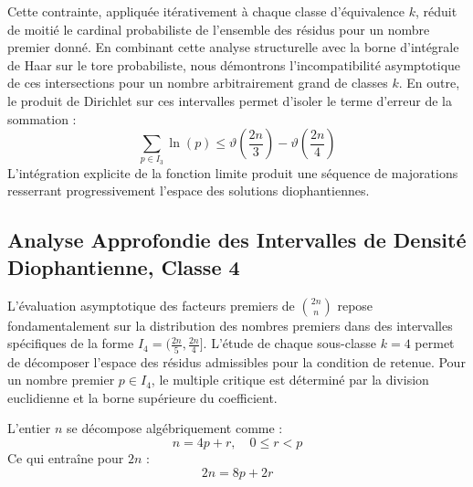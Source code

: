\documentclass[12pt,a4paper]{article}
\begin{document}
    Cette contrainte, appliquée itérativement à chaque classe d'équivalence $k$, réduit de moitié le cardinal probabiliste de l'ensemble des résidus pour un nombre premier donné.
    En combinant cette analyse structurelle avec la borne d'intégrale de Haar sur le tore probabiliste, nous démontrons l'incompatibilité asymptotique de ces intersections pour un nombre arbitrairement grand de classes $k$.
    En outre, le produit de Dirichlet sur ces intervalles permet d'isoler le terme d'erreur de la sommation :
    \begin{equation}
    \sum_{p \in I_3} \ln(p) \le \vartheta\left(\frac{2n}{3}\right) - \vartheta\left(\frac{2n}{4}\right)
    \end{equation}
    L'intégration explicite de la fonction limite produit une séquence de majorations resserrant progressivement l'espace des solutions diophantiennes.
    
    \newpage
    \subsection{Analyse Approfondie des Intervalles de Densité Diophantienne, Classe 4}
    L'évaluation asymptotique des facteurs premiers de $\binom{2n}{n}$ repose fondamentalement sur la distribution des nombres premiers dans des intervalles spécifiques de la forme $I_4 = (\frac{2n}{5}, \frac{2n}{4}]$.
    L'étude de chaque sous-classe $k = 4$ permet de décomposer l'espace des résidus admissibles pour la condition de retenue.
    Pour un nombre premier $p \in I_4$, le multiple critique est déterminé par la division euclidienne et la borne supérieure du coefficient.

    L'entier $n$ se décompose algébriquement comme :
    \begin{equation}
    n = 4 p + r, \quad 0 \le r < p
    \end{equation}
    Ce qui entraîne pour $2n$ :
    \begin{equation}
    2n = 8 p + 2r
    \end{equation}
\end{document}
